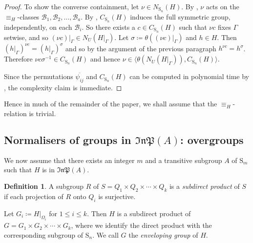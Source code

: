 \documentclass[11pt,a4paper]{article}
\theoremstyle{definition}
\newtheorem{definition}[theorem]{Definition}
\theoremstyle{remark}
\newcommand{\InP}{\mathfrak{InP}}
\newcommand{\Sy}{\mathrm{S}}
\begin{document}
\begin{proof}
To show the converse containment, let $\nu \in N_{\Sy_n}(H)$. 
By , $\nu$ acts on the $\equiv_H$-classes $\mathcal{B}_1, \mathcal{B}_2, \ldots, \mathcal{B}_a$.
By , $C_{\Sy_n}(H)$ induces the full symmetric group, independently, on each $\mathcal{B}_i$. 
So there exists a $c \in  C_{\Sy_n}(H)$ such that $\nu c$ fixes $\Gamma$ setwise, and so $(\nu c)|_{\Gamma} \in N_U(H|_{\Gamma})$. 
Let $\sigma \coloneqq \theta((\nu c)|_{\Gamma})$ and $h \in H$. Then $(h|_{\Gamma})^{\nu c} = (h|_{\Gamma})^{\sigma}$ and so by the argument of the previous paragraph $h^{\nu c} = h^{\sigma}$.
Therefore $\nu c \sigma^{-1} \in  C_{\Sy_n}(H)$ and hence $\nu \in \langle \theta(N_U(H|_{\Gamma})),  C_{\Sy_n}(H) \rangle$.

Since the permutations $\overline{\psi_{ij}}$ and $C_{\Sy_n}(H)$ can be computed in polynomial time by , the complexity claim is immediate. 
\end{proof} 

Hence in much of the remainder of the paper, we shall assume that the $\equiv_H$-relation is trivial. 


\subsection{Normalisers of groups in \texorpdfstring{$\InP(A)$}{InP(A)}: overgroups} 
\label{section: Normalisers of subdirect products}

We now assume that there exists an integer $m$ and a transitive subgroup $A$ of $\Sy_m$ such that $H$ is in $\InP(A)$. 


\begin{definition} \label{enveloping group}
A subgroup $R$ of $S = Q_1 \times Q_2 \times \cdots \times Q_k$ is a \emph{subdirect product} of $S$ if each projection of $R$ onto $Q_i$ is surjective. 

Let $G_i \coloneqq H|_{\Omega_i}$ for $1 \leq i \leq k$. 
Then $H$ is a subdirect product of $G = G_1 \times G_2 \times \cdots \times G_k$, where we identify the direct product with the corresponding subgroup of $\Sy_n$. We call $G$ the \emph{enveloping group} of $H$.
\end{definition}
\end{document}
